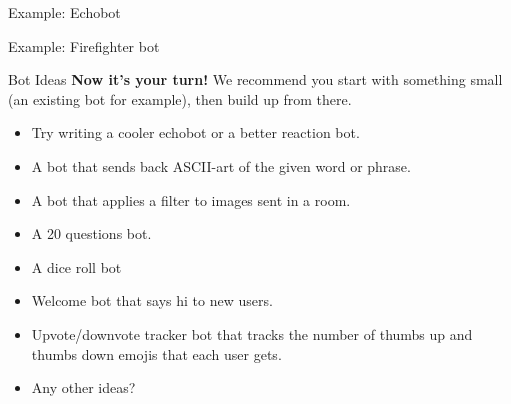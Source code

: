 \documentclass{acm}
\begin{document}
\begin{frame}[standout]
    \Huge
    Example: Echobot
\end{frame}

\begin{frame}[standout]
    \Huge
    Example: Firefighter bot
\end{frame}

\begin{frame}{Bot Ideas}
    \textbf{Now it's your turn!} We recommend you start with something small (an
    existing bot for example), then build up from there.

    \begin{itemize}
        \item Try writing a cooler echobot or a better reaction bot.
        \item A bot that sends back ASCII-art of the given word or phrase.
        \item A bot that applies a filter to images sent in a room.
        \item A 20 questions bot.
        \item A dice roll bot
        \item Welcome bot that says hi to new users.
        \item Upvote/downvote tracker bot that tracks the number of thumbs up
            and thumbs down emojis that each user gets.
        \item Any other ideas?
    \end{itemize}
\end{frame}
\end{document}
